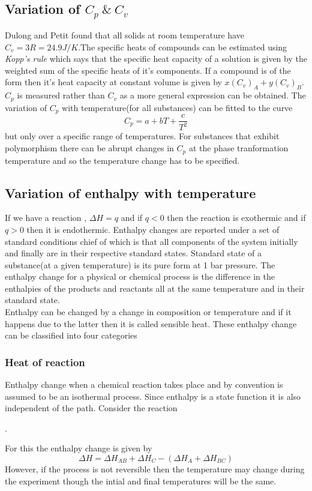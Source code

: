 \documentclass[12pt]{article}
\begin{document}
\subsection{Variation of $C_p \ \& \ C_v$}
Dulong and Petit found that all solids at room temperature have $C_v=3R=24.9 J/K$.The specific heats of compounds can be estimated using \textit{Kopp's rule} which says that the specific heat capacity of a solution is given by the weighted sum of the specific heats of it's components. If a compound is of the form  then it's heat capacity at constant volume is given by $x(C_v)_A+y(C_v)_B$.\\

$C_p$ is measured rather than $C_v$ as a more general expression can be obtained. The variation of $C_p$ with temperature(for all substances) can be fitted to the curve 
\begin{equation}
	C_p=a+bT+\frac{c}{T^2} \label{36}
\end{equation}
but only over a specific range of temperatures. For substances that exhibit polymorphism there can be abrupt changes in $C_p$ at the phase tranformation temperature and so the temperature change has to be specified.

\subsection{Variation of enthalpy with temperature}
If we have a reaction , $\Delta H=q$ and if $q<0$ then the reaction is exothermic and if $q>0$ then it is endothermic. Enthalpy changes are reported under a set of standard conditions chief of which is that all components of the system initially and finally are in their respective standard states. Standard state of a substance(at a given temperature) is its pure form at 1 bar pressure. The enthalpy change for a physical or chemical process is the difference in the enthalpies of the products and reactants all at the same temperature and in their standard state.\\

Enthalpy can be changed by a change in composition or temperature and if it happens due to the latter then it is called sensible heat. These enthalpy change can be classified into four categories

	\subsubsection{Heat of reaction} 
	Enthalpy change when a chemical reaction takes place and by convention is assumed to be an isothermal process. Since enthalpy is a state function it is also independent of the path. Consider the reaction  
	\begin{center}
	. 
	\end{center}
	For this the enthalpy change is given by 
	\begin{equation}
		\Delta H=\Delta H_{AB}+\Delta H_C-(\Delta H_A+\Delta H_{BC})
	\end{equation}
    However, if the process is not reversible then the temperature may change during the experiment though the intial and final temperatures will be the same. 
\end{document}
